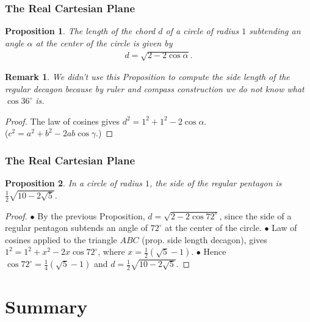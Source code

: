 \documentclass[compress,mathserif,serif]{beamer}
\newtheorem{prop}{Proposition}
\newtheorem{rem}{Remark}
\begin{document}
\begin{frame}
\frametitle{The Real Cartesian Plane}
\begin{prop}The length of the chord $d$ of a circle of radius $1$ subtending an angle $\alpha$ at the center of the circle is given by \begin{align*}
d= \sqrt{2-  2 \cos \alpha}.
\end{align*}
\end{prop}
\pause
\begin{rem} We didn't use this Proposition to compute the side length of the regular decagon because by ruler and compass construction we do not know what $\cos{36^\circ}$ is.
\end{rem}
\pause
\begin{proof}
The law of cosines gives $d^2=1^2+1^2-2 \cos \alpha$.  \\
($c^2= a^2 + b^2-2ab \cos \gamma$.)
\end{proof}
\end{frame}


\begin{frame}
\frametitle{The Real Cartesian Plane}
\begin{prop} In a circle of radius $1$, the side of the regular pentagon is $\frac{1}{2} \sqrt{10-2 \sqrt{5}}$.
\end{prop}
\pause
\begin{proof}
$\bullet$ By the previous Proposition, $d=\sqrt{2-2 \cos 72^\circ}$, since the side of a regular pentagon subtends an angle of $72^\circ$ at the center of the circle.
\pause
\newline
\newline
$\bullet$ Law of cosines applied to the triangle $ABC$ (prop. side length decagon), gives $1^2=1^2+x^2-2x \cos 72^\circ$, where $x= \frac{1}{2}( \sqrt{5}-1)$. 
\pause
\newline
\newline
$\bullet$ Hence $\cos72^\circ = \frac{1}{4}( \sqrt{5}-1)$ and $d= \frac{1}{2}\sqrt{10-2 \sqrt{5}}$.
\end{proof}
\end{frame}


\section{Summary}


\begin{frame}
\begin{center}
\Huge{}
\end{center}
\end{frame}
\end{document}
